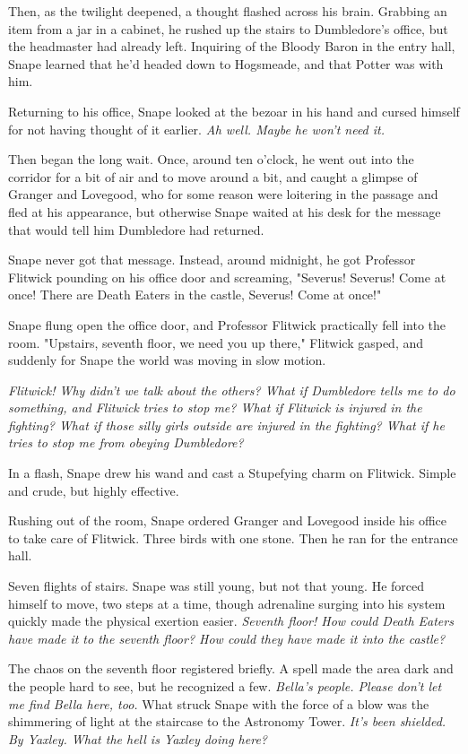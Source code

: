 \documentclass[a4paper,11pt]{article}
\begin{document}
Then, as the twilight deepened, a thought flashed across his brain. Grabbing an item from a jar in a cabinet, he rushed up the stairs to Dumbledore's office, but the headmaster had already left. Inquiring of the Bloody Baron in the entry hall, Snape learned that he'd headed down to Hogsmeade, and that Potter was with him.

Returning to his office, Snape looked at the bezoar in his hand and cursed himself for not having thought of it earlier. \emph{Ah well. Maybe he won't need it.}

Then began the long wait. Once, around ten o'clock, he went out into the corridor for a bit of air and to move around a bit, and caught a glimpse of Granger and Lovegood, who for some reason were loitering in the passage and fled at his appearance, but otherwise Snape waited at his desk for the message that would tell him Dumbledore had returned.

Snape never got that message. Instead, around midnight, he got Professor Flitwick pounding on his office door and screaming, "Severus! Severus! Come at once! There are Death Eaters in the castle, Severus! Come at once!"

Snape flung open the office door, and Professor Flitwick practically fell into the room. "Upstairs, seventh floor, we need you up there," Flitwick gasped, and suddenly for Snape the world was moving in slow motion.

\emph{Flitwick! Why didn't we talk about the others? What if Dumbledore tells me to do something, and Flitwick tries to stop me? What if Flitwick is injured in the fighting? What if those silly girls outside are injured in the fighting? What if he tries to stop me from obeying Dumbledore?}

In a flash, Snape drew his wand and cast a Stupefying charm on Flitwick. Simple and crude, but highly effective.

Rushing out of the room, Snape ordered Granger and Lovegood inside his office to take care of Flitwick. Three birds with one stone. Then he ran for the entrance hall.

Seven flights of stairs. Snape was still young, but not that young. He forced himself to move, two steps at a time, though adrenaline surging into his system quickly made the physical exertion easier. \emph{Seventh floor! How could Death Eaters have made it to the seventh floor? How could they have made it into the castle?}

The chaos on the seventh floor registered briefly. A spell made the area dark and the people hard to see, but he recognized a few. \emph{Bella's people. Please don't let me find Bella here, too.} What struck Snape with the force of a blow was the shimmering of light at the staircase to the Astronomy Tower. \emph{It's been shielded. By Yaxley. What the hell is Yaxley doing here?}
\end{document}
